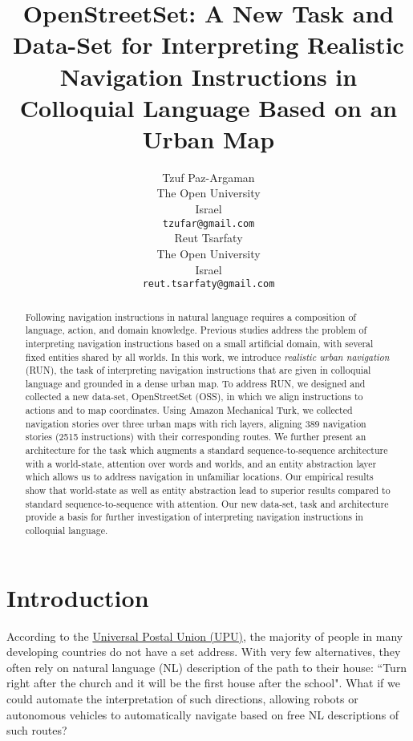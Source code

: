 \documentclass[11pt,a4paper]{article}
\title{OpenStreetSet: A New Task and Data-Set for Interpreting Realistic Navigation Instructions in Colloquial Language Based on an Urban Map}
\author{Tzuf Paz-Argaman \\
  The Open University\\
  Israel \\
  {\tt tzufar@gmail.com} \\\And
  Reut Tsarfaty \\
  The Open University\\
  Israel \\
  {\tt reut.tsarfaty@gmail.com} \\}
\date{}
\begin{document}
\maketitle
\begin{abstract}

  Following navigation instructions in natural language requires a composition of language, action, and domain knowledge. Previous studies address the problem of interpreting navigation instructions based on a small artificial domain, with several fixed entities shared by all worlds. In this work, we introduce {\em realistic urban navigation} (RUN), the task of interpreting navigation instructions that are given in colloquial language and grounded in a dense urban map. To address RUN, we designed and collected a new data-set, OpenStreetSet (OSS), in which we align instructions to actions and to map coordinates.  Using Amazon Mechanical Turk, we collected navigation stories over three  urban maps with rich layers, aligning 389 navigation stories (2515  instructions) with their corresponding routes. We further present an architecture for the task which augments a standard sequence-to-sequence architecture with a world-state, attention over words and worlds, and an entity abstraction layer which allows us to address navigation in unfamiliar locations. Our empirical results show that world-state as well as entity abstraction lead to superior results compared to standard sequence-to-sequence with attention. Our new data-set, task and architecture provide a basis for further investigation of interpreting navigation instructions in colloquial language.  
\end{abstract}


\section{Introduction}

According to the \href{http://www.upu.int/fileadmin/documentsFiles/activities/addressingAssistance/brochureAddressingTheWorldEn.pdf}{Universal Postal Union (UPU)}, the majority of people in many developing countries do not have a set address. With very few alternatives, they often rely on natural language (NL) description of the path to their house: ``Turn right after the church and it will be the first house after the school". What if we could automate the interpretation of such directions, allowing robots or autonomous vehicles to automatically navigate based on free NL descriptions of such routes?  \par
\end{document}
